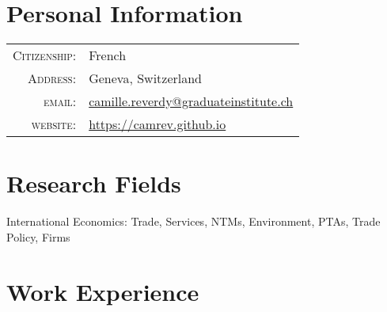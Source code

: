 \documentclass[a4paper,10pt]{article} %
\begin{document}
\pagestyle{empty} %



\par{\bigskip\par} %

\section{\textcolor{bluegray}{Personal Information}}

\begin{tabular}{rl}
\textsc{Citizenship:} & French \\
\textsc{Address:} & Geneva, Switzerland \\
\textsc{email:} & \href{mailto:camille.reverdy@graduateinstitute.ch}{camille.reverdy@graduateinstitute.ch} \\
\textsc{website:} & \href{https://camrev.github.io}{https://camrev.github.io}
\end{tabular}


\section{\textcolor{bluegray}{Research Fields}}


International Economics: Trade, Services, NTMs, Environment, PTAs, Trade Policy, Firms


\section{\textcolor{bluegray}{Work Experience}}
\end{document}
